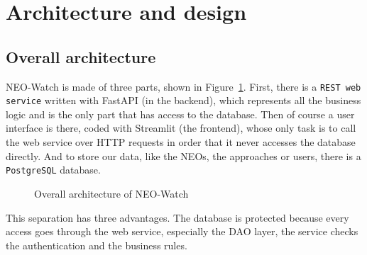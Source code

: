 \section{Architecture and design}
\label{sec:design}

\subsection{Overall architecture}

NEO-Watch is made of three parts, shown in Figure~\ref{fig:architecture}. First, there is a \texttt{REST web service} written with FastAPI (in the backend), which represents all the business logic and is the only part that has access to the database.
Then of course a user interface is there, coded with Streamlit (the frontend), whose only task is to call the web service over HTTP requests in order that it never accesses the database directly. And to store our data, like the NEOs, the approaches or users, there is a \texttt{PostgreSQL} database.

\begin{figure}[H]
  \centering
  \caption{Overall architecture of NEO-Watch}
  \label{fig:architecture}
\end{figure}

This separation has three advantages. The database is protected because every access goes through the
web service, especially the DAO layer, the service checks the authentication and the business rules. 

